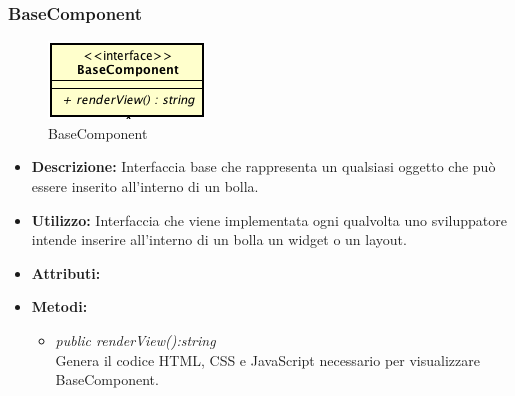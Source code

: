 \subsubsection{BaseComponent}

\label{BaseComponent}
\begin{figure}[ht]
	\centering
	\includegraphics[scale=0.5]{Sezioni/SottosezioniST/img/BaseComponent.png}
	\caption{BaseComponent}
\end{figure}

\begin{itemize}
\item \textbf{Descrizione:} Interfaccia base che rappresenta un qualsiasi oggetto che può essere inserito all'interno di un bolla.
\item \textbf{Utilizzo:} Interfaccia che viene implementata ogni qualvolta uno sviluppatore intende inserire all'interno di un bolla un widget o un layout.
\item \textbf{Attributi:}
\item \textbf{Metodi:}
\begin{itemize}
\item \textit{public renderView():string}\\
Genera il codice HTML, CSS e JavaScript necessario per visualizzare BaseComponent.
\end{itemize}
\end{itemize}